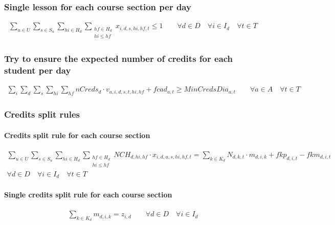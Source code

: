\subsubsection{Single lesson for each course section per day}
\begin{eqnarray}
\sum\limits_{u \in U} \sum\limits_{s \in S_{u}} \sum\limits_{hi \in H_{d}} \sum_{\substack {hf \in H_{d} \\ hi\le hf}} x_{i,d,s,hi,hf,t}  \leq  1  \nonumber \qquad 
\forall d \in D \quad
\forall i \in I_{d} \quad
\forall t \in T 
\end{eqnarray}



\subsubsection{Try to ensure the expected number of credits for each student per day}
\begin{eqnarray}
\sum\limits_{i} \sum\limits_{d} \sum\limits_{s} \sum\limits_{hi} \sum\limits_{hf} nCreds_{d} \cdot v_{a,i,d,s,t,hi,hf} + fcad_{a,t} \ge MinCredsDia_{a,t} \nonumber \qquad
\forall a \in A \quad
\forall t \in T
\end{eqnarray}


\subsubsection{Credits split rules}

\paragraph{Credits split rule for each course section}
\begin{eqnarray}
\sum\limits_{u \in U} \sum\limits_{s \in S_{u}} \sum\limits_{hi \in H_{d}} \sum_{\substack {hf \in H_{d} \\ hi\le hf}}
 NCH_{d,hi,hf} \cdot x_{i,d,u,s,hi,hf,t} = \sum\limits_{k \in K_{d}}N_{d,k,t} \cdot m_{d,i,k} + fkp_{d,i,t} - fkm_{d,i,t} \nonumber \qquad 
\\
\forall d \in D \quad
\forall i \in I_{d} \quad
\forall t \in T \nonumber
\end{eqnarray}

\paragraph{Single credits split rule for each course section}
\begin{eqnarray}
\sum\limits_{k \in K_{d}} m_{d,i,k} = z_{i,d} \nonumber \qquad 
\forall d \in D \quad
\forall i \in I_{d}
\end{eqnarray}



